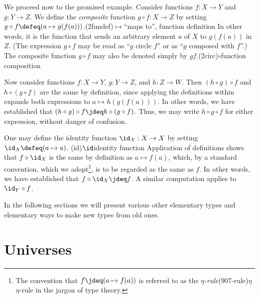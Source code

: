 We proceed now to the promised example.  Consider functions $f : X \to Y$ and $g : Y \to Z$.  We define the \emph{composite} function
$g \circ f : X \to Z$ by setting $g \circ f \defeq (a \mapsto g(f(a)))$.\glossary(2fundef){$\mapsto$}{``maps to'', function definition}
In other words, it
is the function that sends an arbitrary element $a$ of $X$ to $g(f(a))$ in $Z$.  (The expression $g \circ f$ may be read as ``$g$ circle $f$''
or as ``$g$ composed with $f$''.)  The composite function $g \circ f$ may also be denoted simply by $gf$.\glossary(2circ){$\circ$}{function composition}

Now consider functions $f : X \to Y$, $g : Y \to Z$, and $h : Z \to W$.  Then $(h \circ g) \circ f$ and $h \circ (g \circ f)$ are the same by
definition, since applying the definitions within expands both expressions to $a \mapsto h(g(f(a)))$.  In other
words, we have established that $(h \circ g) \circ f \jdeq h \circ (g \circ f)$.  Thus, we may write $h \circ g \circ f$ for
either expression, without danger of confusion.

One may define the identity function $\id_X : X \to X$ by setting
$\id_X \defeq (a \mapsto a)$.
\glossary(id){$\id$}{identity function} Application of definitions shows that
$f \circ \id_X$ is the same by definition as $a \mapsto f(a)$, which, by a standard convention, which we adopt\footnote{The convention that
  $f \jdeq (a \mapsto f(a))$ is referred to as the \emph{$\eta$-rule}\glossary(907-rule){$\eta$}{$\eta$-rule} in the jargon of type theory.}, is to be regarded as the same as $f$.  In
other words, we have established that $f \circ \id_X \jdeq f$.%
\label{page:idofetaf}
A similar computation applies to $\id_Y \circ f$.

In the following sections we will present various other elementary types and elementary ways to make new types from old ones.

\section{Universes}
\label{sec:universes}

